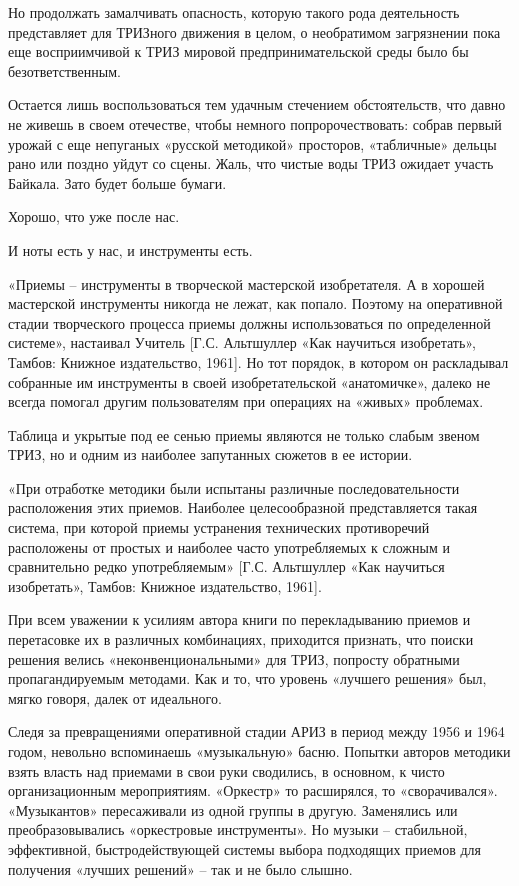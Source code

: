 \documentclass[11pt,a4paper]{article}
\begin{document}
Но продолжать замалчивать опасность, которую такого рода деятельность
представляет для ТРИЗного движения в целом, о необратимом загрязнении пока еще
восприимчивой к ТРИЗ мировой предпринимательской среды было бы
безответственным.

Остается лишь воспользоваться тем удачным стечением обстоятельств, что давно
не живешь в своем отечестве, чтобы немного попророчествовать: собрав первый
урожай с еще непуганых «русской методикой» просторов, «табличные» дельцы рано
или поздно уйдут со сцены. Жаль, что чистые воды ТРИЗ ожидает участь
Байкала. Зато будет больше бумаги.

Хорошо, что уже после нас.

И ноты есть у нас, и инструменты есть.

«Приемы -- инструменты в творческой мастерской изобретателя. А в хорошей
мастерской инструменты никогда не лежат, как попало. Поэтому на оперативной
стадии творческого процесса приемы должны использоваться по определенной
системе», настаивал Учитель [Г.С. Альтшуллер «Как научиться изобретать»,
  Тамбов: Книжное издательство, 1961]. Но тот порядок, в котором он
раскладывал собранные им инструменты в своей изобретательской «анатомичке»,
далеко не всегда помогал другим пользователям при операциях на «живых»
проблемах.

Таблица и укрытые под ее сенью приемы являются не только слабым звеном ТРИЗ,
но и одним из наиболее запутанных сюжетов в ее истории.

«При отработке методики были испытаны различные последовательности
расположения этих приемов. Наиболее целесообразной представляется такая
система, при которой приемы устранения технических противоречий расположены от
простых и наиболее часто употребляемых к сложным и сравнительно редко
употребляемым» [Г.С. Альтшуллер «Как научиться изобретать», Тамбов: Книжное
  издательство, 1961].

При всем уважении к усилиям автора книги по перекладыванию приемов и
перетасовке их в различных комбинациях, приходится признать, что поиски
решения велись «неконвенциональными» для ТРИЗ, попросту обратными
пропагандируемым методами. Как и то, что уровень «лучшего решения» был, мягко
говоря, далек от идеального.

Следя за превращениями оперативной стадии АРИЗ в период между 1956 и 1964
годом, невольно вспоминаешь «музыкальную» басню. Попытки авторов методики
взять власть над приемами в свои руки сводились, в основном, к чисто
организационным мероприятиям. «Оркестр» то расширялся, то
«сворачивался». «Музыкантов» пересаживали из одной группы в другую. Заменялись
или преобразовывались «оркестровые инструменты». Но музыки -- стабильной,
эффективной, быстродействующей системы выбора подходящих приемов для получения
«лучших решений» -- так и не было слышно.
\end{document}
